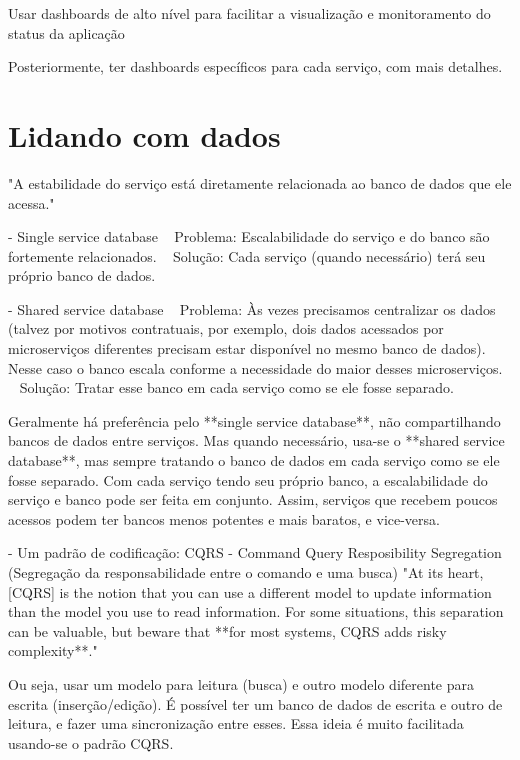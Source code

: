 Usar dashboards de alto nível para facilitar a visualização e monitoramento do status da aplicação

Posteriormente, ter dashboards específicos para cada serviço, com mais detalhes.

\section{Lidando com dados}

"A estabilidade do serviço está diretamente relacionada ao banco de dados que ele acessa."

        - Single service database
            ~ Problema: Escalabilidade do serviço e do banco são fortemente relacionados.
            ~ Solução: Cada serviço (quando necessário) terá seu próprio banco de dados.

        - Shared service database
            ~ Problema: Às vezes precisamos centralizar os dados (talvez por motivos contratuais, por exemplo, dois dados acessados por microserviços diferentes precisam estar disponível no mesmo banco de dados). Nesse caso o banco escala conforme a necessidade do maior desses microserviços.
            ~ Solução: Tratar esse banco em cada serviço como se ele fosse separado.

        Geralmente há preferência pelo **single service database**, não compartilhando bancos de dados entre serviços. Mas quando necessário, usa-se o **shared service database**, mas sempre tratando o banco de dados em cada serviço como se ele fosse separado.
        Com cada serviço tendo seu próprio banco, a escalabilidade do serviço e banco pode ser feita em conjunto. Assim, serviços que recebem poucos acessos podem ter bancos menos potentes e mais baratos, e vice-versa.

        - Um padrão de codificação: CQRS - Command Query Resposibility Segregation (Segregação da responsabilidade entre o comando e uma busca)
            "At its heart, [CQRS] is the notion that you can use a different model to update information than the model you use to read information. For some situations, this separation can be valuable, but beware that **for most systems, CQRS adds risky complexity**."

           Ou seja, usar um modelo para leitura (busca) e outro modelo diferente para escrita (inserção/edição). É possível ter um banco de dados de escrita e outro de leitura, e fazer uma sincronização entre esses. Essa ideia é muito facilitada usando-se o padrão CQRS.
           
